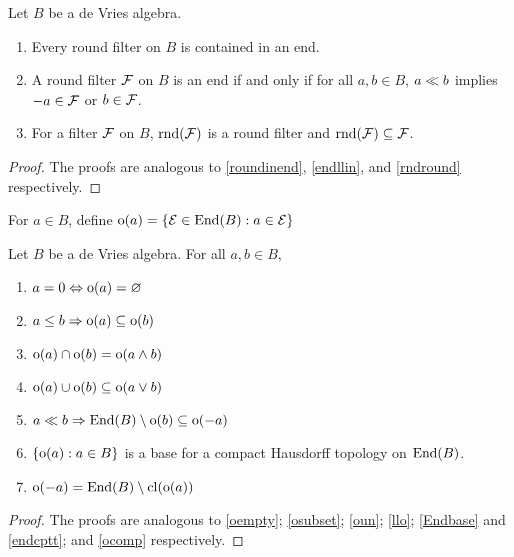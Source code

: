 \begin{proposition}
	Let \( B \) be a de Vries algebra.
	\begin{enumerate}[label={(\arabic*)},ref={\theproposition(\arabic*)}]
		\item Every round filter on \( B \) is contained in an end.
		\item A round filter \( \mathcal{F} \) on \( B \) is an end if and only if for all \( a,b \in B \), \( a \ll b \) implies \( -a \in \mathcal{F} \) or \( b \in \mathcal{F} \).
		\item For a filter \( \mathcal{F} \) on \( B \), \( \operatorname{rnd}(\mathcal{F}) \) is a round filter and \( \operatorname{rnd}(\mathcal{F}) \subseteq \mathcal{F} \).
	\end{enumerate}
\end{proposition}
\begin{proof}
	The proofs are analogous to \ref{roundinend}, \ref{endllin}, and \ref{rndround} respectively.
\end{proof}

\begin{definition}
	For \( a \in B \), define \( \operatorname{o}(a) = \{ \mathcal{E} \in \operatorname{End}(B): a \in \mathcal{E} \} \)
\end{definition}

\begin{proposition}
	Let \( B \) be a de Vries algebra.  For all \( a,b \in B \),
	\begin{enumerate}[label={(\arabic*)},ref={\theproposition(\arabic*)}]
		\item \label{devoempty}
			\( a = 0 \Leftrightarrow \operatorname{o}(a) = \varnothing \)
		\item \label{devosubset}
			\( a \leq b \Rightarrow \operatorname{o}(a) \subseteq \operatorname{o}(b) \)
		\item \label{devoint}
			\( \operatorname{o}(a) \cap \operatorname{o}(b) = \operatorname{o}(a \wedge b) \)
		\item \label{devoun}
			\( \operatorname{o}(a) \cup \operatorname{o}(b) \subseteq \operatorname{o}(a \vee b) \)
		\item \label{devo}
			\( a \ll b \Rightarrow \operatorname{End}(B) \setminus \operatorname{o}(b) \subseteq \operatorname{o}(-a) \)
		\item \label{devobase}
			\( \{ \operatorname{o}(a): a \in B \} \) is a base for a compact Hausdorff topology on \( \operatorname{End}(B) \).
		\item \label{devocomp}
			\( \operatorname{o}(-a) = \operatorname{End}(B) \setminus \operatorname{cl}(\operatorname{o}(a)) \)
	\end{enumerate}
\end{proposition}
\begin{proof}
	The proofs are analogous to \ref{oempty}; \ref{osubset}; \ref{oun}; \ref{llo}; \ref{Endbase} and \ref{endcptt}; and \ref{ocomp} respectively.
\end{proof}

